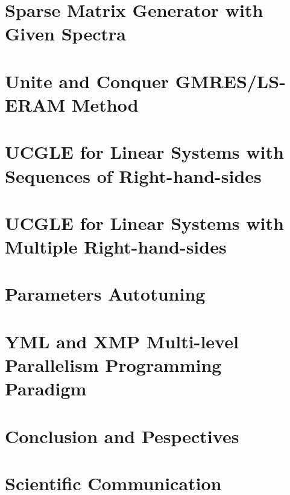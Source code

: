 \documentclass{xinzhewu}
\begin{document}


\chapter{Sparse Matrix Generator with Given Spectra}\label{Sparse Matrix Generator with Given Spectra}



\chapter[Unite and Conquer GMRES/LS-ERAM Method]{Unite and Conquer GMRES/LS-ERAM Method}\label{Unite and Conquer GMRES/LS-ERAM Method}



\chapter{UCGLE for Linear Systems with Sequences of Right-hand-sides}\label{UCGLE for Linear Systems with Sequences of Right-hand-sides}



\chapter{UCGLE for Linear Systems with Multiple Right-hand-sides} \label{UCGLE for Linear Systems with Multiple Right-hand-sides}



\chapter{Parameters Autotuning}  \label{Parameters Autotuning}



\chapter{YML and XMP Multi-level Parallelism Programming Paradigm} \label{YML and XMP Multi-level Parallelism Programming Paradigm}



\chapter{Conclusion and Pespectives} \label{Conclusion and Pespectives}



\chapter*{Scientific Communication}




\clearemptydoublepage
\end{document}
